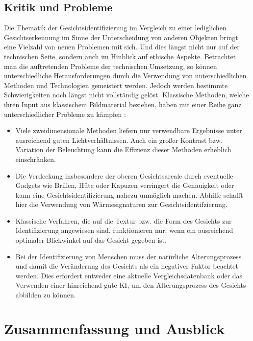 \documentclass[doktyp=semarbeit, sprache=german]{TUBAFarbeiten}
\begin{document}
\subsection{Kritik und Probleme}
Die Thematik der Gesichtsidentifizierung im Vergleich zu einer lediglichen Gesichtserkennung im Sinne der Unterscheidung von anderen Objekten bringt eine Vielzahl von neuen Problemen mit sich. Und dies längst nicht nur auf der technischen Seite, sondern auch im Hinblick auf ethische Aspekte.
Betrachtet man die auftretenden Probleme der technischen Umsetzung, so können unterschiedliche Herausforderungen durch die Verwendung von unterschiedlichen Methoden und Technologien gemeistert werden. Jedoch werden bestimmte Schwierigkeiten noch längst nicht vollständig gelöst. Klassische Methoden, welche ihren Input aus klassischem Bildmaterial beziehen, haben mit einer Reihe ganz unterschiedlicher Probleme zu kämpfen \cite{MainBook}:
\begin{itemize}
\item Viele zweidimensionale Methoden liefern nur verwendbare Ergebnisse unter ausreichend guten Lichtverhältnissen. Auch ein großer Kontrast bzw. Variation der Beleuchtung kann die Effizienz dieser Methoden erheblich einschränken.
\item Die Verdeckung insbesondere der oberen Gesichtsareale durch eventuelle Gadgets wie Brillen, Hüte oder Kapuzen verringert die Genauigkeit oder kann eine Gesichtsidentifizierung nahezu unmöglich machen. Abhilfe schafft hier die Verwendung von Wärmesignaturen zur Gesichtsidentifzierung.
\item Klassische Verfahren, die auf die Textur bzw. die Form des Gesichts zur Identifizierung angewiesen sind, funktionieren nur, wenn ein ausreichend optimaler Blickwinkel auf das Gesicht gegeben ist.
\item Bei der Identifizierung von Menschen muss der natürliche Alterungsprozess und damit die Veränderung des Gesichts als ein negativer Faktor beachtet werden. Dies erfordert entweder eine aktuelle Vergleichsdatenbank oder das Verwenden einer hinreichend gute KI, um den Alterungsprozess des Gesichts abbilden zu können.
\end{itemize}

\section{Zusammenfassung und Ausblick}
\newpage
{}
\end{document}
